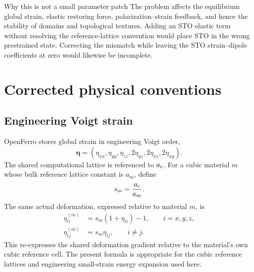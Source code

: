 \documentclass[11pt,a4paper]{article}
\begin{document}
\begin{warnbox}{Why this is not a small parameter patch}
The problem affects the equilibrium global strain, elastic restoring force, polarization--strain feedback, and hence the stability of domains and topological textures. Adding an STO elastic term without resolving the reference-lattice convention would place STO in the wrong prestrained state. Correcting the mismatch while leaving the STO strain--dipole coefficients at zero would likewise be incomplete.
\end{warnbox}

\section{Corrected physical conventions}

\subsection{Engineering Voigt strain}
OpenFerro stores global strain in engineering Voigt order,
\begin{equation}
 \bm\eta=(\eta_{xx},\eta_{yy},\eta_{zz},2\eta_{yz},2\eta_{xz},2\eta_{xy}).
\end{equation}
The shared computational lattice is referenced to $a_{\rm c}$. For a cubic material $m$ whose bulk reference lattice constant is $a_m$, define
\begin{equation}
  s_m=\frac{a_{\rm c}}{a_m}.
\end{equation}
The same actual deformation, expressed relative to material $m$, is
\begin{align}
  \eta^{(m)}_{ii} &= s_m(1+\eta_{ii})-1,\qquad i=x,y,z,\\
  \eta^{(m)}_{ij} &= s_m\eta_{ij},\qquad i\ne j.
\end{align}
This re-expresses the shared deformation gradient relative to the material's own cubic reference cell. The present formula is appropriate for the cubic reference lattices and engineering small-strain energy expansion used here.

\begin{center}
\end{center}
\end{document}
